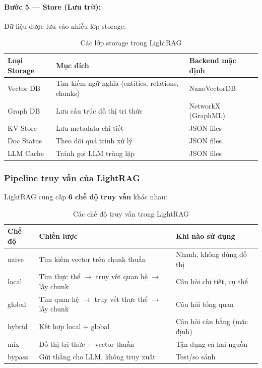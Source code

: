 \documentclass[12pt,a4paper]{article}
\begin{document}
\paragraph{Bước 5 --- Store (Lưu trữ):}
Dữ liệu được lưu vào nhiều lớp storage:

\begin{table}[H]
\centering
\caption{Các lớp storage trong LightRAG}
\begin{tabular}{p{3.5cm}p{5cm}p{4cm}}
\toprule
\textbf{Loại Storage} & \textbf{Mục đích} & \textbf{Backend mặc định} \\
\midrule
Vector DB & Tìm kiếm ngữ nghĩa (entities, relations, chunks) & NanoVectorDB \\
Graph DB & Lưu cấu trúc đồ thị tri thức & NetworkX (GraphML) \\
KV Store & Lưu metadata chi tiết & JSON files \\
Doc Status & Theo dõi quá trình xử lý & JSON files \\
LLM Cache & Tránh gọi LLM trùng lặp & JSON files \\
\bottomrule
\end{tabular}
\end{table}

\subsubsection{Pipeline truy vấn của LightRAG}

LightRAG cung cấp \textbf{6 chế độ truy vấn} khác nhau:

\begin{table}[H]
\centering
\caption{Các chế độ truy vấn trong LightRAG}
\begin{tabular}{p{2cm}p{5cm}p{5.5cm}}
\toprule
\textbf{Chế độ} & \textbf{Chiến lược} & \textbf{Khi nào sử dụng} \\
\midrule
naive & Tìm kiếm vector trên chunk thuần & Nhanh, không dùng đồ thị \\
local & Tìm thực thể $\to$ truy vết quan hệ $\to$ lấy chunk & Câu hỏi chi tiết, cụ thể \\
global & Tìm quan hệ $\to$ truy vết thực thể $\to$ lấy chunk & Câu hỏi tổng quan \\
hybrid & Kết hợp local + global & Câu hỏi cân bằng (mặc định) \\
mix & Đồ thị tri thức + vector thuần & Tận dụng cả hai nguồn \\
bypass & Gửi thẳng cho LLM, không truy xuất & Test/so sánh \\
\bottomrule
\end{tabular}
\end{table}
\end{document}

